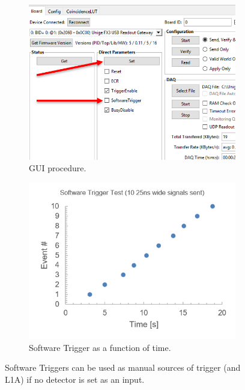 \begin{figure}[htbp!] 
\centering  
    \begin{subfigure}[t]{.4\textwidth}
    \includegraphics[width=1.0\textwidth]{SoftwareTrigger.png}
    \captionsetup{width=0.8\textwidth}
    \caption{GUI procedure.}
    \label{fig:SoftwareTriggerGUI}
    \end{subfigure}
    \begin{subfigure}[t]{.4\textwidth}
    \includegraphics[width=1.0\textwidth]{SoftwareTriggerGraph.png}
    \captionsetup{width=0.8\textwidth}
    \caption{Software Trigger as a function of time.}
    \label{fig:SoftwareTriggerGraph}
    \end{subfigure}
\caption[Software Trigger results]{Software Triggers can be used as manual sources of trigger (and L1A) if no detector is set as an input.}
\label{SoftwareTrigger}
\end{figure}

